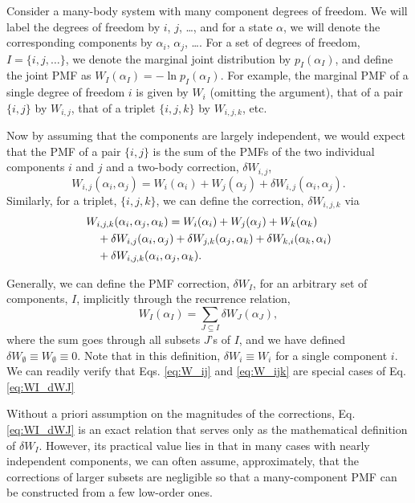 \documentclass[preprint, superscriptaddress]{revtex4-1}
\begin{document}
Consider a many-body system with many component degrees of freedom.
%
We will label the degrees of freedom by $i$, $j$, \dots,
and for a state $\alpha$,
we will denote the corresponding components by
$\alpha_i$, $\alpha_j$, \dots.
%
%
For a set of degrees of freedom, $I = \{i, j, \dots\}$,
we denote the marginal joint distribution by $p_I(\alpha_I)$,
and define the joint PMF as $W_I(\alpha_I) = -\ln p_I(\alpha_I)$.
%
For example,
the marginal PMF of a single degree of freedom $i$ is given by $W_i$ (omitting the argument),
that of a pair $\{i, j\}$ by $W_{i, j}$,
that of a triplet $\{i, j, k\}$ by $W_{i, j, k}$, etc.

Now by assuming that the components are largely independent,
we would expect that the PMF of a pair $\{i, j\}$
is the sum of the PMFs of the two individual components $i$ and $j$
and a two-body correction, $\delta W_{i,j}$,
%
\begin{equation}
  W_{i,j}(\alpha_i, \alpha_j)
  =
  W_i(\alpha_i) + W_j(\alpha_j)
  + \delta W_{i,j}(\alpha_i, \alpha_j)
  .
  \label{eq:W_ij}
\end{equation}
%
Similarly, for a triplet, $\{i, j, k\}$,
we can define the correction, $\delta W_{i,j,k}$ via
%
\begin{align}
  &W_{i,j,k}(\alpha_i, \alpha_j, \alpha_k)
  =
  W_i(\alpha_i) + W_j(\alpha_j) + W_k(\alpha_k)
  \notag \\
  &\quad
  + \delta W_{i,j}(\alpha_i, \alpha_j)
  + \delta W_{j,k}(\alpha_j, \alpha_k)
  + \delta W_{k,i}(\alpha_k, \alpha_i)
  \notag \\
  &\quad
  + \delta W_{i,j,k}(\alpha_i, \alpha_j, \alpha_k)
  .
  \label{eq:W_ijk}
\end{align}
%


Generally, we can define the PMF correction, $\delta W_I$,
for an arbitrary set of components, $I$,
implicitly through the recurrence relation,
%
\begin{equation}
  W_I(\alpha_I)
  =
  \sum_{J \subseteq I}
  \delta W_J(\alpha_J)
  ,
  \label{eq:WI_dWJ}
\end{equation}
%
where the sum goes through all subsets $J$'s of $I$,
and we have defined
$\delta W_\emptyset \equiv W_\emptyset \equiv 0$.
%
Note that in this definition,
$\delta W_i \equiv W_i$
for a single component $i$.
%
We can readily verify that
Eqs. \eqref{eq:W_ij} and \eqref{eq:W_ijk}
are special cases of Eq. \eqref{eq:WI_dWJ}

Without a priori assumption on the magnitudes of the corrections,
Eq. \eqref{eq:WI_dWJ} is an exact relation
that serves only as the mathematical definition of $\delta W_I$.
%
However, its practical value lies in that in many cases
with nearly independent components,
we can often assume, approximately,
that the corrections of larger subsets are negligible
so that a many-component PMF can be constructed
from a few low-order ones.
\end{document}
